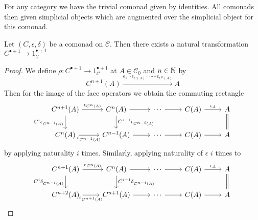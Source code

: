 For any category we have the trivial comonad given by identities. All comonads then given simplicial objects which are augmented over the simplicial object for this comonad.

\begin{prop}[label=prop:simpMonMapToId]
    Let $(C,\epsilon,\delta)$ be a comonad on $\mathcal{C}$. Then there exists a natural transformation $C^{\bullet+1}\to 1_{\mathcal{C}}^{\bullet+1}$
\end{prop}
\begin{proof}
    We define $\rho:C^{\bullet+1}\to 1_{\mathcal{C}}^{\bullet+1}$ at $A \in \mathcal{C}_0$ and $n \in \mathbb N$ by
    \begin{equation*}
        C^{n+1}(A)\xrightarrow{\epsilon_A\circ \epsilon_{C(A)}\circ \cdots \circ \epsilon_{C^n(A)}}A
    \end{equation*}
    Then for the image of the face operators we obtain the commuting rectangle
    \[\begin{tikzcd}
        {C^{n+1}(A)} & {C^n(A)} & \cdots & {C(A)} & A \\
        {C^n(A)} & {C^{n-1}(A)} & \cdots & {C(A)} & A
        \arrow["{\epsilon_{C^n(A)}}", from=1-1, to=1-2]
        \arrow[from=1-2, to=1-3]
        \arrow[from=1-3, to=1-4]
        \arrow["{\epsilon_A}", from=1-4, to=1-5]
        \arrow[Rightarrow, no head, from=1-5, to=2-5]
        \arrow["{C^i\epsilon_{C^{n-i}(A)}}"', from=1-1, to=2-1]
        \arrow["{\epsilon_{C^{n-1}(A)}}"', from=2-1, to=2-2]
        \arrow[from=2-2, to=2-3]
        \arrow[from=2-3, to=2-4]
        \arrow[from=2-4, to=2-5]
        \arrow["{C^{i-1}\epsilon_{C^{n-i}(A)}}", from=1-2, to=2-2]
    \end{tikzcd}\]
    by applying naturality $i$ times. Similarly, applying naturality of $\epsilon$ $i$ times to 
    \[\begin{tikzcd}
        {C^{n+1}(A)} & {C^n(A)} & \cdots & {C(A)} & A \\
        {C^{n+2}(A)} & {C^{n+1}(A)} & \cdots & {C(A)} & A
        \arrow["{\epsilon_{C^n(A)}}", from=1-1, to=1-2]
        \arrow[from=1-2, to=1-3]
        \arrow[from=1-3, to=1-4]
        \arrow["{\epsilon_A}", from=1-4, to=1-5]
        \arrow[Rightarrow, no head, from=1-5, to=2-5]
        \arrow["{C^i\delta_{C^{n-i}(A)}}"', from=1-1, to=2-1]
        \arrow["{\epsilon_{C^{n+1}(A)}}"', from=2-1, to=2-2]
        \arrow[from=2-2, to=2-3]
        \arrow[from=2-3, to=2-4]
        \arrow[from=2-4, to=2-5]
        \arrow["{C^{i-1}\delta_{C^{n-i}(A)}}", from=1-2, to=2-2]
    \end{tikzcd}\]

\end{proof}
